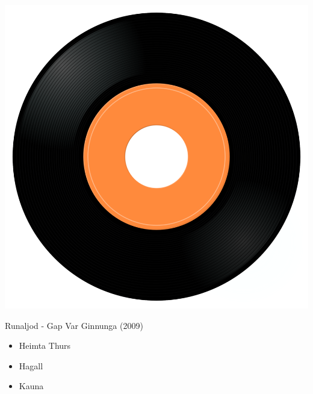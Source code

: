 \begin{minipage}[t]{0.25\textwidth}
\captionsetup{type=figure}
\includegraphics[width=\textwidth]{Images/cover.png}
\caption*{Runaljod - Gap Var Ginnunga (2009)}
\end{minipage}
\begin{minipage}[t]{0.25\textwidth}\vspace{0pt}
\begin{itemize}[nosep,leftmargin=1em,labelwidth=*,align=left]
	\setlength{\itemsep}{0pt}
	\item Heimta Thurs
	\item Hagall
	\item Kauna
\end{itemize}
\end{minipage}
